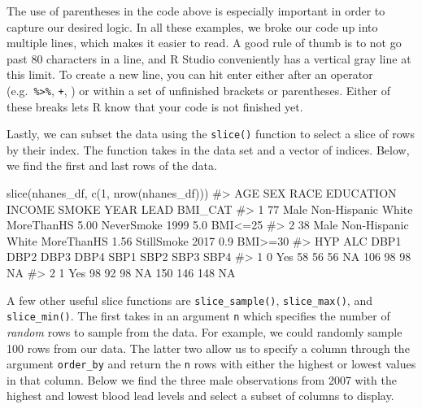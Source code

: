 \documentclass[
  letterpaper,
]{krantz}
\makeatletter
\newenvironment{Shaded}{\begin{snugshade}}{\end{snugshade}}
\newcommand{\CommentTok}[1]{\textcolor[rgb]{0.37,0.37,0.37}{#1}}
\newcommand{\DecValTok}[1]{\textcolor[rgb]{0.68,0.00,0.00}{#1}}
\newcommand{\FunctionTok}[1]{\textcolor[rgb]{0.28,0.35,0.67}{#1}}
\newcommand{\NormalTok}[1]{\textcolor[rgb]{0.00,0.23,0.31}{#1}}
\newenvironment{kframe}{%
\medskip{}
\setlength{\fboxsep}{.8em}
 \def\at@end@of@kframe{}%
 \ifinner\ifhmode%
  \def\at@end@of@kframe{\end{minipage}}%
  \begin{minipage}{\columnwidth}%
 \fi\fi%
 \def\FrameCommand##1{\hskip\@totalleftmargin \hskip-\fboxsep
 \colorbox{shadecolor}{##1}\hskip-\fboxsep
     \hskip-\linewidth \hskip-\@totalleftmargin \hskip\columnwidth}%
 \MakeFramed {\advance\hsize-\width
   \@totalleftmargin\z@ \linewidth\hsize
   \@setminipage}}%
 {\par\unskip\endMakeFramed%
 \at@end@of@kframe}
\renewenvironment{Shaded}{\begin{kframe}}{\end{kframe}}
\makeatother
\begin{document}
The use of parentheses in the code above is especially important in
order to capture our desired logic. In all these examples, we broke our
code up into multiple lines, which makes it easier to read. A good rule
of thumb is to not go past 80 characters in a line, and R Studio
conveniently has a vertical gray line at this limit. To create a new
line, you can hit enter either after an operator
(e.g.~\texttt{\%\textgreater{}\%}, \texttt{+}, \texttt{\textbar{}}) or
within a set of unfinished brackets or parentheses. Either of these
breaks lets R know that your code is not finished yet.

Lastly, we can subset the data using the \texttt{slice()} function to
select a slice of rows by their index. The function takes in the data
set and a vector of indices. Below, we find the first and last rows of
the data.

\begin{Shaded}
\begin{Highlighting}[]
\FunctionTok{slice}\NormalTok{(nhanes\_df, }\FunctionTok{c}\NormalTok{(}\DecValTok{1}\NormalTok{, }\FunctionTok{nrow}\NormalTok{(nhanes\_df)))}
\CommentTok{\#\textgreater{}   AGE  SEX               RACE  EDUCATION INCOME      SMOKE YEAR LEAD BMI\_CAT}
\CommentTok{\#\textgreater{} 1  77 Male Non{-}Hispanic White MoreThanHS   5.00 NeverSmoke 1999  5.0 BMI\textless{}=25}
\CommentTok{\#\textgreater{} 2  38 Male Non{-}Hispanic White MoreThanHS   1.56 StillSmoke 2017  0.9 BMI\textgreater{}=30}
\CommentTok{\#\textgreater{}   HYP ALC DBP1 DBP2 DBP3 DBP4 SBP1 SBP2 SBP3 SBP4}
\CommentTok{\#\textgreater{} 1   0 Yes   58   56   56   NA  106   98   98   NA}
\CommentTok{\#\textgreater{} 2   1 Yes   98   92   98   NA  150  146  148   NA}
\end{Highlighting}
\end{Shaded}

A few other useful slice functions are \texttt{slice\_sample()},
\texttt{slice\_max()}, and \texttt{slice\_min()}. The first takes in an
argument \texttt{n} which specifies the number of \emph{random} rows to
sample from the data. For example, we could randomly sample 100 rows
from our data. The latter two allow us to specify a column through the
argument \texttt{order\_by} and return the \texttt{n} rows with either
the highest or lowest values in that column. Below we find the three
male observations from 2007 with the highest and lowest blood lead
levels and select a subset of columns to display.
\end{document}
